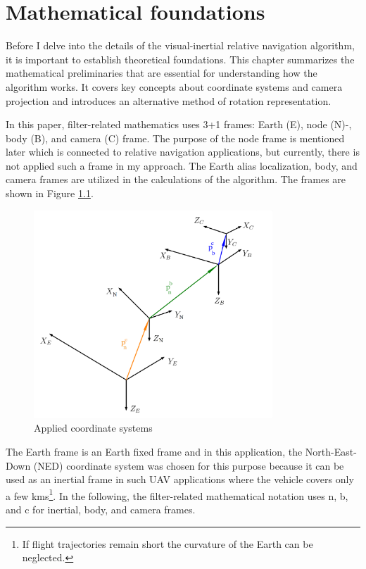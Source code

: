 \chapter{Mathematical foundations}
\label{chap:math}

Before I delve into the details of the visual-inertial relative navigation algorithm, it is important to establish theoretical foundations. This chapter summarizes the mathematical preliminaries that are essential for understanding how the algorithm works. It covers key concepts about coordinate systems and camera projection and introduces an alternative method of rotation representation. 

In this paper, filter-related mathematics uses 3+1 frames: Earth (E), node (N)-, body (B), and camera (C) frame. The purpose of the node frame is mentioned later which is connected to relative navigation applications, but currently, there is not applied such a frame in my approach. The Earth alias localization, body, and camera frames are utilized in the calculations of the algorithm. The frames are shown in Figure \ref{fig:coord-sys}. 
\begin{figure}[!ht]
    \centering
    \includegraphics[width=0.8\textwidth]{figures/Coord_sys.png}
    \caption{Applied coordinate systems}
    \label{fig:coord-sys}
\end{figure}

The Earth frame is an Earth fixed frame and in this application, the North-East-Down (NED) coordinate system was chosen for this purpose because it can be used as an inertial frame in such UAV applications where the vehicle covers only a few \si{\kilo\meter}s\footnote{If flight trajectories remain short the curvature of the Earth can be neglected.}. In the following, the filter-related mathematical notation uses n, b, and c for inertial, body, and camera frames.

